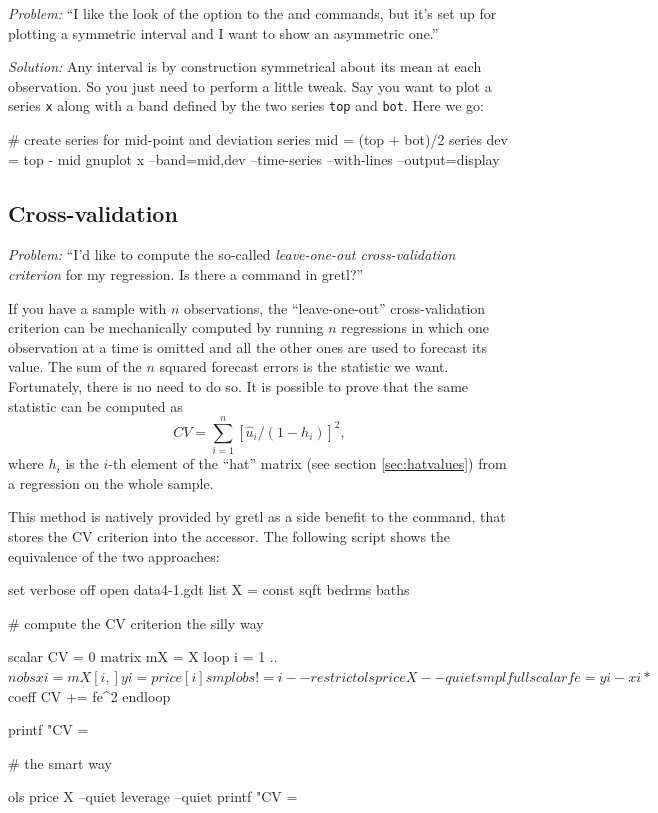 \emph{Problem:} ``I like the look of the  option to the
 and  commands, but it's set up for plotting a
symmetric interval and I want to show an asymmetric one.''

\emph{Solution:} Any interval is by construction symmetrical about its
mean at each observation. So you just need to perform a little
tweak. Say you want to plot a series \texttt{x} along with a band
defined by the two series \texttt{top} and \texttt{bot}. Here we go:
\begin{code}
# create series for mid-point and deviation
series mid = (top + bot)/2
series dev = top - mid
gnuplot x --band=mid,dev --time-series --with-lines --output=display
\end{code}

\subsection{Cross-validation}
\label{sec:xvalid}

\emph{Problem:} ``I'd like to compute the so-called \emph{leave-one-out
cross-validation criterion} for my regression. Is there a command in
gretl?''

If you have a sample with $n$ observations, the ``leave-one-out''
cross-validation criterion can be mechanically computed by running $n$
regressions in which one observation at a time is omitted and all the
other ones are used to forecast its value. The sum of the $n$ squared
forecast errors is the statistic we want. Fortunately, there is no
need to do so. It is possible to prove that the same statistic can be
computed as
\[
CV = \sum_{i=1}^n [\hat{u}_{i}/(1-h_{i})]^2,
\]
where $h_i$ is the $i$-th element of the ``hat'' matrix (see section
\ref{sec:hatvalues}) from a regression on the whole sample.

This method is natively provided by gretl as a side benefit to the
 command, that stores the CV criterion into the
 accessor. The following script shows the equivalence of
the two approaches:
\begin{code}
set verbose off
open data4-1.gdt
list X = const sqft bedrms baths

# compute the CV criterion the silly way

scalar CV = 0
matrix mX = {X}
loop i = 1 .. $nobs
    xi = mX[i,]
    yi = price[i]
    smpl obs != i --restrict
    ols price X --quiet
    smpl full
    scalar fe = yi - xi * $coeff
    CV += fe^2
endloop

printf "CV = %

# the smart way

ols price X --quiet
leverage --quiet
printf "CV = %
\end{code}

